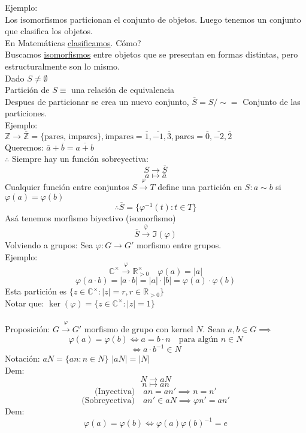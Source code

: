 \documentclass[11pt]{book}
\theoremstyle{definition}
\begin{document}
Ejemplo:\\
Los isomorfismos particionan el conjunto de objetos. Luego tenemos un conjunto que clasifica los objetos.\\
En Matemáticas \underline{clasificamos}. Cómo?\\
Buscamos \underline{isomorfismos} entre objetos que se presentan en formas distintas, pero estructuralmente son lo mismo.\\
Dado $S\neq\emptyset$\\
Partición de $S\equiv$ una relación de equivalencia\\
Despues de particionar se crea un nuevo conjunto, $\overline{S}=S/\sim=$ Conjunto de las particiones.\\
Ejemplo:\\
$\mathbb{Z}\rightarrow\overline{\mathbb{Z}}=\{\textrm{pares, impares}\},\textrm{impares}=\overline{1},\overline{-1},\overline{3},\textrm{pares}=\overline{0},\overline{-2},\overline{2}$\\
Queremos: $\overline{a}+\overline{b}=\overline{a+b}$\\
$\therefore$ Siempre hay un función sobreyectiva:
\[
S\rightarrow \overline{S}
\]
\[
a\mapsto \overline{a}
\]
Cualquier función entre conjuntos $S\xrightarrow{\varphi}T$ define una partición en $S:a\sim b$ si $\varphi(a)=\varphi(b)$
\[
\therefore \overline{S}=\{\varphi^{-1}(t):t\in T\}
\]
Asá­ tenemos morfismo biyectivo (isomorfismo)
\[
\overline{S}\xrightarrow{\overline{\varphi}}\Im(\varphi)
\]
Volviendo a grupos: Sea $\varphi:G\rightarrow G'$ morfismo entre grupos.\\
Ejemplo:
\[
\mathbb{C}^\times\xrightarrow{\varphi}\mathbb{R}_{>0}^\times \quad \varphi(a)=|a|
\]
\[
\varphi(a\cdot b)=|a\cdot b|=|a|\cdot |b|=\varphi(a)\cdot\varphi(b)
\]
Esta partición es $\{z\in\mathbb{C}^\times:|z|=r,r\in\mathbb{R}_{>0}\}$\\
Notar que: $\ker(\varphi)=\{z\in\mathbb{C}^\times:|z|=1\}$\\
\\
Proposición: $G\xrightarrow{\varphi}G'$ morfismo de grupo con kernel $N$. Sean $a,b\in G\implies$
\[
\varphi(a)=\varphi(b)\iff a=b\cdot n\quad\textrm{para algún }n\in N
\]
\[
\iff a\cdot b^{-1}\in N
\]
Notación: $aN=\{an: n\in N\}$
$|aN|=|N|$\\
Dem:\\
\[
N\rightarrow aN
\]
\[n\mapsto an
\]
\[
\textrm{(Inyectiva)}\quad an=an'\implies n=n'
\]
\[
\textrm{(Sobreyectiva)}\quad an'\in aN \implies \varphi{n'}=an'
\]
Dem:
\[
\varphi(a)=\varphi(b)\iff \varphi(a)\varphi(b)^{-1}=e
\]
\end{document}
